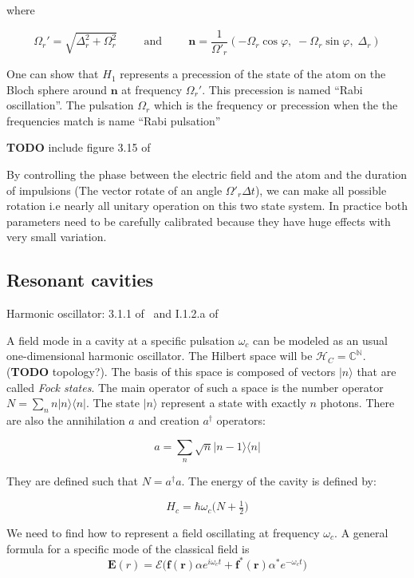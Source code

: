 \documentclass[10pt]{report}
\theoremstyle{plain}
\theoremstyle{definition}
\theoremstyle{remark}
\newcommand{\N}{\ensuremath{\mathbb{N}}}
\newcommand{\C}{\ensuremath{\mathbb{C}}}
\newcommand{\TODO}{\textbf{TODO}}
\newcommand{\ket}[1]{|#1\rangle}
\newcommand{\bra}[1]{\langle#1|}
\newcommand{\bs}{\boldsymbol}
\begin{document}
where

\[ \Omega_r' = \sqrt{\Delta_r^2 + \Omega_r^2} \hspace {1cm}
  \text{and}\hspace{1cm} \bs n = \frac 1 {\Omega'_r}(-\Omega_r \cos \varphi,\;
  -\Omega_r \sin \varphi,\; \Delta_r)\]

One can show that $H_1$ represents a precession of the state of the atom on the
Bloch sphere around $\bs n$ at frequency $\Omega_r'$. This precession is named
``Rabi oscillation''. The pulsation $\Omega_r$ which is the frequency or
precession when the the frequencies match is name ``Rabi pulsation''

\TODO{} include figure 3.15 of~\cite{Har06}

By controlling the phase between the electric field and the atom and the
duration of impulsions (The vector rotate of an angle $\Omega'_r\Delta t$), we
can make all possible rotation i.e nearly all unitary operation on this two
state system. In practice both parameters need to be carefully calibrated
because they have huge effects with very small variation.

\subsection{Resonant cavities}\label{ssec:rescav}

Harmonic oscillator: 3.1.1 of~\cite{Har06} and I.1.2.a of~\cite{SayPHD11}

A field mode in a cavity at a specific pulsation $\omega_c$ can be modeled
as an usual one-dimensional harmonic oscillator. The Hilbert space will be
$\mathcal{H}_C = \C^\N$. (\TODO{} topology?). The basis of this space is composed of vectors $\ket n$
that are called \emph{Fock states}. The main operator of such a space is the
number operator $N = \sum_n n\ket n \bra n$. The state $\ket n$ represent a
state with exactly $n$ photons. There are also the annihilation $a$ and creation $a^\dagger$ operators:

\[a = \sum_n \sqrt{n} \ket {n-1} \bra{n}\]

They are defined such that $N = a^\dagger a$. The energy of the cavity is
defined by:

\[H_c = \hbar \omega_c \big(N + \tfrac 12\big)\]

We need to find how to represent a field oscillating at frequency $\omega_c$.
A general formula for a specific mode of the classical field is
\[\bs E(r) = \mathcal{E}\big(\bs f(\bs r) \alpha e^{i\omega_c t} + \bs f^*(\bs r)
  \alpha^* e^{-\omega_c t}\big)\]
\end{document}
